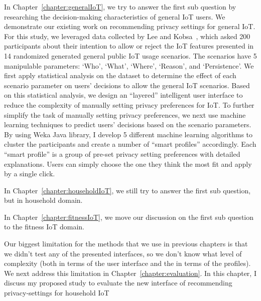 In Chapter~\ref{chapter:generalIoT}, we try to answer the first sub question by researching the decision-making characteristics of general IoT users. We demonstrate our existing work on recommending privacy settings for general IoT. For this study, we leveraged data collected by Lee and Kobsa~\cite{lee2016understanding}, which asked 200 participants about their intention to allow or reject the IoT features presented in 14 randomized generated general public IoT usage scenarios. The scenarios have 5 manipulable parameters: `Who', `What', `Where', `Reason', and `Persistence'. We first apply statistical analysis on the dataset to determine the effect of each scenario parameter on users' decisions to allow the general IoT scenarios. Based on this statistical analysis, we design an ``layered'' intelligent user interface to reduce the complexity of manually setting privacy preferences for IoT. To further simplify the task of manually setting privacy preferences, we next use machine learning techniques to predict users' decisions based on the scenario parameters. By using Weka Java library, I develop 5 different machine learning algorithms to cluster the participants and create a number of ``smart profiles''  accordingly. Each ``smart profile'' is a group of pre-set privacy setting preferences with detailed explanations. Users can simply choose the one they think the most fit and apply by a single click.
	
In Chapter~\ref{chapter:householdIoT}, we still try to answer the first sub question, but in household domain. 
	
In Chapter~\ref{chapter:fitnessIoT}, we move our discussion on the first sub question to the fitness IoT domain.
	
Our biggest limitation for the methods that we use in previous chapters is that we didn't test any of the presented interfaces, so we don't know what level of complexity (both in terms of the user interface and the in terms of the profiles). We next address this limitation in Chapter~\ref{chapter:evaluation}. In this chapter, I discuss my proposed study to evaluate the new interface of recommending privacy-settings for household IoT





